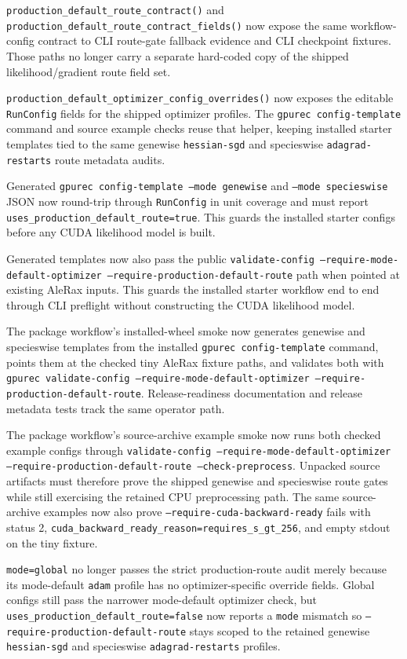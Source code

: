 \documentclass[11pt]{article}
\begin{document}
\texttt{production\_default\_route\_contract()} and
\texttt{production\_default\_route\_contract\_fields()} now expose the same
workflow-config contract to CLI route-gate fallback evidence and CLI checkpoint
fixtures.  Those paths no longer carry a separate hard-coded copy of the
shipped likelihood/gradient route field set.

\texttt{production\_default\_optimizer\_config\_overrides()} now exposes the
editable \texttt{RunConfig} fields for the shipped optimizer profiles.  The
\texttt{gpurec config-template} command and source example checks reuse that
helper, keeping installed starter templates tied to the same genewise
\texttt{hessian-sgd} and specieswise \texttt{adagrad-restarts} route metadata
audits.

Generated \texttt{gpurec config-template --mode genewise} and
\texttt{--mode specieswise} JSON now round-trip through \texttt{RunConfig} in
unit coverage and must report \texttt{uses\_production\_default\_route=true}.
This guards the installed starter configs before any CUDA likelihood model is
built.

Generated templates now also pass the public
\texttt{validate-config --require-mode-default-optimizer
--require-production-default-route} path when pointed at existing AleRax
inputs.  This guards the installed starter workflow end to end through CLI
preflight without constructing the CUDA likelihood model.

The package workflow's installed-wheel smoke now generates genewise and
specieswise templates from the installed \texttt{gpurec config-template}
command, points them at the checked tiny AleRax fixture paths, and validates
both with \texttt{gpurec validate-config --require-mode-default-optimizer
--require-production-default-route}.  Release-readiness documentation and
release metadata tests track the same operator path.

The package workflow's source-archive example smoke now runs both checked
example configs through \texttt{validate-config
--require-mode-default-optimizer --require-production-default-route
--check-preprocess}.  Unpacked source artifacts must therefore prove the shipped
genewise and specieswise route gates while still exercising the retained CPU
preprocessing path.  The same source-archive examples now also prove
\texttt{--require-cuda-backward-ready} fails with status 2,
\texttt{cuda_backward_ready_reason=requires_s_gt_256}, and empty stdout on the
tiny fixture.

\texttt{mode=global} no longer passes the strict production-route audit merely
because its mode-default \texttt{adam} profile has no optimizer-specific
override fields.  Global configs still pass the narrower mode-default optimizer
check, but \texttt{uses\_production\_default\_route=false} now reports a
\texttt{mode} mismatch so \texttt{--require-production-default-route} stays
scoped to the retained genewise \texttt{hessian-sgd} and specieswise
\texttt{adagrad-restarts} profiles.
\end{document}
